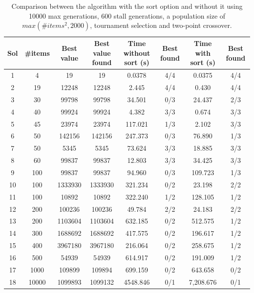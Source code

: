 \documentclass[anon]{CI}
\begin{document}
\begin{table}[htbp]
    \centering
    \begin{adjustbox}{max width=\textwidth}
    \begin{tabular}{|c|c|c|c|c|c|c|c|}
    \hline 
    Sol & \#items & Best value & \makecell{Best value\\found} & \makecell{Time\\without sort (s)} & Best found & \makecell{Time\\with sort (s)} & Best found\\
    \hline 
    1 & 4 & 19  & 19  & 0.0378 & 4/4 & 0.0375 & 4/4\\
    \hline 
    2 & 19 & 12248 & 12248 & 2.445 & 4/4 & 0.430 & 4/4\\
    \hline 
    3 & 30 & 99798  & 99798  & 34.501 & 0/3 & 24.437 & 2/3\\
    \hline 
    4 & 40 & 99924  & 99924  & 4.382 & 3/3 & 0.674 & 3/3\\
    \hline 
    5 & 45 & 23974  & 23974  & 117.021 & 1/3 & 2.102 & 3/3\\
    \hline 
    6 & 50 & 142156  & 142156  & 247.373 & 0/3 & 76.890 & 1/3\\
    \hline 
    7 & 50 & 5345  & 5345  & 73.624 & 3/3 & 18.885 & 3/3\\
    \hline 
    8 & 60 & 99837  & 99837  & 12.803 & 3/3 & 34.425 & 3/3\\
    \hline 
    9 & 100 & 99837  & 99837  & 94.960 & 0/3 & 109.723 & 1/3\\
    \hline 
    10 & 100 & 1333930  & 1333930  & 321.234 & 0/2 & 23.198 & 2/2\\
    \hline 
    11 & 100 & 10892  & 10892  & 322.240 & 1/2 & 128.105 & 1/2\\
    \hline 
    12 & 200 & 100236  & 100236  & 49.784 & 2/2 & 24.183 & 2/2\\
    \hline 
    13 & 200 & 1103604  & 1103604  & 632.185 & 0/2 & 512.575 & 1/2\\
    \hline 
    14 & 300 & 1688692  & 1688692  & 417.575 & 0/2 & 196.617 & 1/2\\
    \hline 
    15 & 400 & 3967180  & 3967180  & 216.064 & 0/2 & 258.675 & 1/2\\
    \hline 
    16 & 500 & 54939  & 54939  & 614.917 & 0/2 & 191.009 & 1/2\\
    \hline 
    17 & 1000 & 109899 & 109894 & 699.159 & 0/2 & 643.658 & 0/2\\
    \hline 
    18 & 10000 & 1099893 & 1099132 & 4548.846 & 0/1 & 7,208.676 & 0/1\\
    \hline 
    \end{tabular}
    \end{adjustbox}
    \caption{Comparison between the algorithm with the sort option and without
    it using 10000 max generations, 600 stall generations, a population
    size of $max(\#items^{2},2000)$, tournament selection and two-point
    crossover.}
    \label{tab:results}
\end{table}
\end{document}
